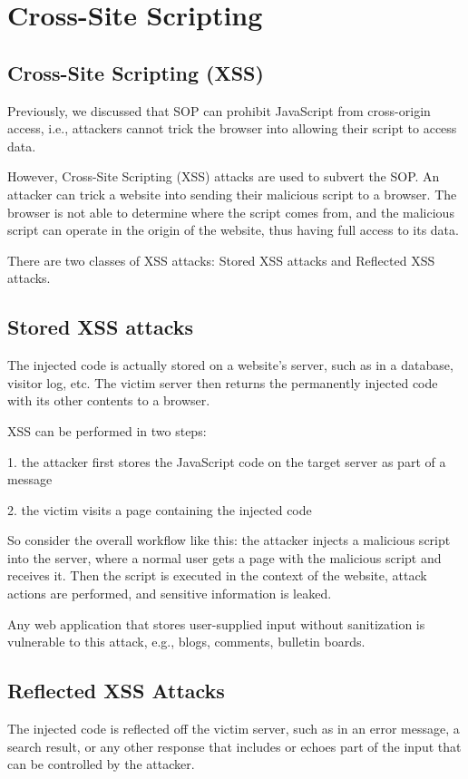 \section{Cross-Site Scripting}
\subsection{Cross-Site Scripting (XSS)}
Previously, we discussed that SOP can prohibit JavaScript from cross-origin access, i.e., attackers cannot trick the browser into allowing their script to access data. 

However, Cross-Site Scripting (XSS) attacks are used to subvert the SOP. An attacker can trick a website into sending their malicious script to a browser. The browser is not able to determine where the script comes from, and the malicious script can operate in the origin of the website, thus having full access to its data. 

There are two classes of XSS attacks: Stored XSS attacks and Reflected XSS attacks. 

\subsection{Stored XSS attacks}
The injected code is actually stored on a website's server, such as in a database, visitor log, etc. The victim server then returns the permanently injected code with its other contents to a browser. 

XSS can be performed in two steps:

1. the attacker first stores the JavaScript code on the target server as part of a message  

2. the victim visits a page containing the injected code  

So consider the overall workflow like this: the attacker injects a malicious script into the server, where a normal user gets a page with the malicious script and receives it. Then the script is executed in the context of the website, attack actions are performed, and sensitive information is leaked. 

Any web application that stores user-supplied input without sanitization is vulnerable to this attack, e.g., blogs, comments, bulletin boards. 

\subsection{Reflected XSS Attacks}
The injected code is reflected off the victim server, such as in an error message, a search result, or any other response that includes or echoes part of the input that can be controlled by the attacker.

